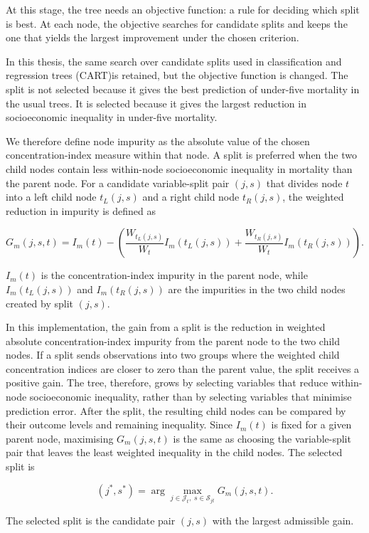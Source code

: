 \documentclass[
  11pt,
  a4paper,
]{article}
\begin{document}
At this stage, the tree needs an objective function: a rule for deciding
which split is best. At each node, the objective searches for candidate
splits and keeps the one that yields the largest improvement under the
chosen criterion.

In this thesis, the same search over candidate splits used in
classification and regression trees (CART)is retained, but the objective
function is changed. The split is not selected because it gives the best
prediction of under-five mortality in the usual trees. It is selected
because it gives the largest reduction in socioeconomic inequality in
under-five mortality.

We therefore define node impurity as the absolute value of the chosen
concentration-index measure within that node. A split is preferred when
the two child nodes contain less within-node socioeconomic inequality in
mortality than the parent node. For a candidate variable-split pair
\((j,s)\) that divides node \(t\) into a left child node \(t_L(j,s)\)
and a right child node \(t_R(j,s)\), the weighted reduction in impurity
is defined as

\[
G_m(j, s, t)
=
I_m(t)
-
\left(
\frac{W_{t_L(j,s)}}{W_t} I_m(t_L(j,s))
+
\frac{W_{t_R(j,s)}}{W_t} I_m(t_R(j,s))
\right).
\]

\(I_m(t)\) is the concentration-index impurity in the parent node, while
\(I_m(t_L(j,s))\) and \(I_m(t_R(j,s))\) are the impurities in the two
child nodes created by split \((j,s)\).

In this implementation, the gain from a split is the reduction in
weighted absolute concentration-index impurity from the parent node to
the two child nodes. If a split sends observations into two groups where
the weighted child concentration indices are closer to zero than the
parent value, the split receives a positive gain. The tree, therefore,
grows by selecting variables that reduce within-node socioeconomic
inequality, rather than by selecting variables that minimise prediction
error. After the split, the resulting child nodes can be compared by
their outcome levels and remaining inequality. Since \(I_m(t)\) is fixed
for a given parent node, maximising \(G_m(j,s,t)\) is the same as
choosing the variable-split pair that leaves the least weighted
inequality in the child nodes. The selected split is

\[
(j^*, s^*)
=
\arg\max_{j \in \mathcal{J}_t,\; s \in \mathcal{S}_{jt}}
G_m(j, s, t).
\]

The selected split is the candidate pair \((j,s)\) with the largest
admissible gain.
\end{document}
